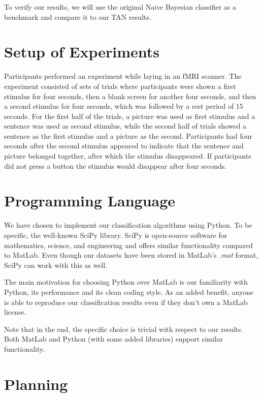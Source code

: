 \documentclass[a4paper, 11pt]{scrartcl}
\begin{document}
To verify our results, we will use the original Naive Bayesian classifier as a benchmark and compare it to our TAN results.

\section{Setup of Experiments}
\label{sec:setup}

Participants performed an experiment while laying in an fMRI scanner. The experiment consisted of sets of trials where participants were shown a first stimulus for four seconds, then a blank screen for another four seconds, and then a second stimulus for four seconds, which was followed by a rest period of 15 seconds. For the first half of the trials, a picture was used as first stimulus and a sentence was used as second stimulus, while the second half of trials showed a sentence as the first stimulus and a picture as the second. Participants had four seconds after the second stimulus appeared to indicate that the sentence and picture belonged together, after which the stimulus disappeared. If participants did not press a button the stimulus would disappear after four seconds.

\section{Programming Language}
\label{sec:language}

We have chosen to implement our classification algorithms using Python. To be specific,  the well-known SciPy library. SciPy is open-source software for mathematics, science, and engineering and offers similar functionality compared to MatLab. Even though our datasets have been stored in MatLab's \textit{.mat} format, SciPy can work with this as well.

The main motivation for choosing Python over MatLab is our familiarity with Python, its performance and its clean coding style. As an added benefit, anyone is able to reproduce our classification results even if they don't own a MatLab license. 

Note that in the end, the specific choice is trivial with respect to our results. Both MatLab and Python (with some added libraries) support similar functionality.

\section{Planning}
\end{document}
